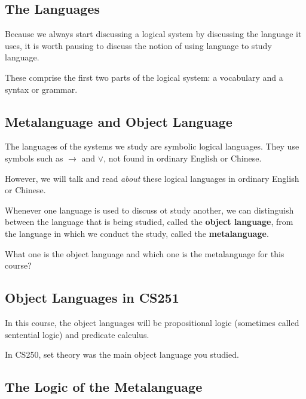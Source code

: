 \documentclass[
paper=128mm:96mm, %
fontsize=11pt, %
pagesize, %
parskip=half-, %
]{scrartcl} %
\theoremstyle{mythmstyle} %
\begin{document}
\clearpage

\subsection{The Languages}
Because we always start discussing a logical system by discussing the
language it uses, it is worth pausing to discuss the notion of using language
to study language. 

These comprise the first two parts of the logical system: a vocabulary and a syntax or grammar.

\clearpage


\subsection{Metalanguage and Object Language}

The languages of the systems we study are symbolic logical languages. They use symbols such as $\rightarrow$ and $\lor$, not found in ordinary English or Chinese.

However, we will talk and read \textit{about} these logical languages in ordinary English or Chinese. 

Whenever one language is used to discuss ot study another, we can distinguish between the language that is being studied, called the \textbf{object language}, from the language in which we conduct the study, called the \textbf{metalanguage}.

What one is the object language and which one is the metalanguage for this course?

\clearpage


\subsection{Object Languages in CS251}

In this course, the object languages will be propositional logic (sometimes called sentential logic) and predicate calculus.

In CS250, set theory was the main object language you studied.

\clearpage



\subsection{The Logic of the Metalanguage}
\end{document}
